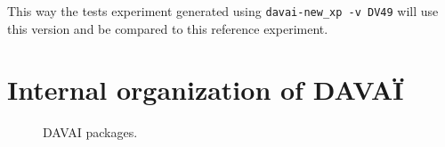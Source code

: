 \documentclass[a4paper,10pt,twoside]{article}
\begin{document}
\begin{appendix}
\noindent This way the tests experiment generated using \texttt{davai-new\_xp -v DV49} will use this version and be compared to this reference experiment.








\newpage
\section{Internal organization of DAVAÏ}

\begin{figure}[h!]\hspace{-2cm}
 \begin{center}\hspace{-2cm}
 \end{center}
 \caption{\label{fig:davai_ecosystem} DAVAI packages.}
\end{figure}



\end{appendix}
\end{document}
